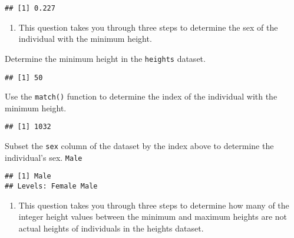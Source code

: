 \documentclass[]{article}
\newenvironment{Shaded}{\begin{snugshade}}{\end{snugshade}}
\newcommand{\DecValTok}[1]{\textcolor[rgb]{0.00,0.00,0.81}{#1}}
\newcommand{\KeywordTok}[1]{\textcolor[rgb]{0.13,0.29,0.53}{\textbf{#1}}}
\newcommand{\NormalTok}[1]{#1}
\newcommand{\OperatorTok}[1]{\textcolor[rgb]{0.81,0.36,0.00}{\textbf{#1}}}
\providecommand{\tightlist}{%
  \setlength{\itemsep}{0pt}\setlength{\parskip}{0pt}}
\begin{document}
\begin{verbatim}
## [1] 0.227
\end{verbatim}

\begin{enumerate}
\def\labelenumi{\arabic{enumi}.}
\setcounter{enumi}{3}
\tightlist
\item
  This question takes you through three steps to determine the sex of
  the individual with the minimum height.
\end{enumerate}

Determine the minimum height in the \texttt{heights} dataset.

\begin{Shaded}
\end{Shaded}

\begin{verbatim}
## [1] 50
\end{verbatim}

Use the \texttt{match()} function to determine the index of the
individual with the minimum height.

\begin{Shaded}
\end{Shaded}

\begin{verbatim}
## [1] 1032
\end{verbatim}

Subset the \texttt{sex} column of the dataset by the index above to
determine the individual's sex. \texttt{Male}

\begin{Shaded}
\end{Shaded}

\begin{verbatim}
## [1] Male
## Levels: Female Male
\end{verbatim}

\begin{enumerate}
\def\labelenumi{\arabic{enumi}.}
\setcounter{enumi}{4}
\tightlist
\item
  This question takes you through three steps to determine how many of
  the integer height values between the minimum and maximum heights are
  not actual heights of individuals in the heights dataset.
\end{enumerate}
\end{document}
